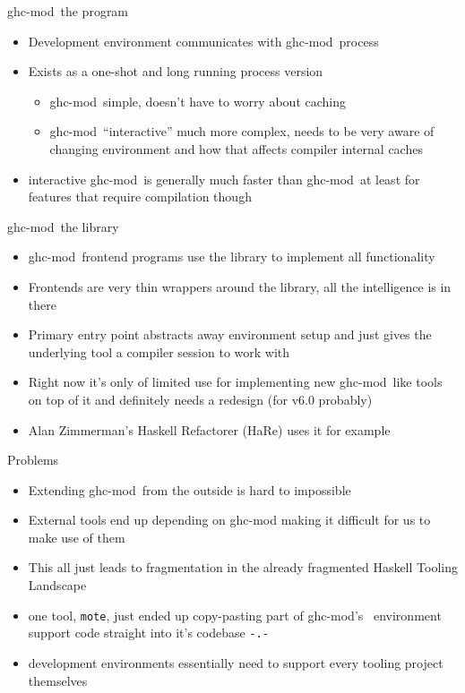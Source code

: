\documentclass{beamer}
\newcommand\gm{{\Rokkitt ghc-mod}\ }
\newcommand\gms{{\Rokkitt ghc-mod's}\ }
\begin{document}
\begin{frame}{\gm the program}
  \begin{itemize}
  \item Development environment communicates with \gm process
  \item Exists as a one-shot and long running process version
  \begin{itemize}
    \item \gm simple, doesn't have to worry about caching
    \item \gm ``interactive'' much more complex, needs to be very aware of
      changing environment and how that affects compiler internal caches
  \end{itemize}
  \item interactive \gm is generally much faster than \gm at least for features
      that require compilation though
  \end{itemize}
\end{frame}

\begin{frame}{\gm the library}
  \begin{itemize}
  \item \gm frontend programs use the library to implement all functionality
  \item Frontends are very thin wrappers around the library, all the
    intelligence is in there
  \item Primary entry point abstracts away environment setup and just gives the
    underlying tool a compiler session to work with
  \item Right now it's only of limited use for implementing new \gm like tools
    on top of it and definitely needs a redesign (for v6.0 probably)
  \item Alan Zimmerman's Haskell Refactorer (HaRe) uses it for example
  \end{itemize}
\end{frame}

\begin{frame}{Problems}
  \begin{itemize}
  \item Extending \gm from the outside is hard to impossible
  \item External tools end up depending on ghc-mod making it difficult for us to
    make use of them
  \item This all just leads to fragmentation in the already fragmented Haskell
    Tooling Landscape
  \item one tool, \texttt{mote}, just ended up copy-pasting part of \gms
    environment support code straight into it's codebase \texttt{-.-}
  \item development environments essentially need to support every tooling
    project themselves
  \end{itemize}
\end{frame}
\end{document}
